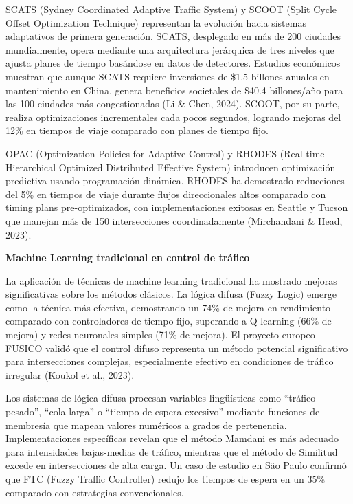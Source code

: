 \documentclass[12pt,a4paper,oneside]{report}
\begin{document}
SCATS (Sydney Coordinated Adaptive Traffic System) y SCOOT (Split Cycle Offset Optimization Technique) representan la evolución hacia sistemas adaptativos de primera generación. SCATS, desplegado en más de 200 ciudades mundialmente, opera mediante una arquitectura jerárquica de tres niveles que ajusta planes de tiempo basándose en datos de detectores. Estudios económicos muestran que aunque SCATS requiere inversiones de \$1.5 billones anuales en mantenimiento en China, genera beneficios societales de \$40.4 billones/año para las 100 ciudades más congestionadas (Li \& Chen, 2024). SCOOT, por su parte, realiza optimizaciones incrementales cada pocos segundos, logrando mejoras del 12\% en tiempos de viaje comparado con planes de tiempo fijo.

OPAC (Optimization Policies for Adaptive Control) y RHODES (Real-time Hierarchical Optimized Distributed Effective System) introducen optimización predictiva usando programación dinámica. RHODES ha demostrado reducciones del 5\% en tiempos de viaje durante flujos direccionales altos comparado con timing plans pre-optimizados, con implementaciones exitosas en Seattle y Tucson que manejan más de 150 intersecciones coordinadamente (Mirchandani \& Head, 2023).

\textbf{Machine Learning tradicional en control de tráfico}

La aplicación de técnicas de machine learning tradicional ha mostrado mejoras significativas sobre los métodos clásicos. La lógica difusa (Fuzzy Logic) emerge como la técnica más efectiva, demostrando un 74\% de mejora en rendimiento comparado con controladores de tiempo fijo, superando a Q-learning (66\% de mejora) y redes neuronales simples (71\% de mejora). El proyecto europeo FUSICO validó que el control difuso representa un método potencial significativo para intersecciones complejas, especialmente efectivo en condiciones de tráfico irregular (Koukol et al., 2023).

Los sistemas de lógica difusa procesan variables lingüísticas como ``tráfico pesado'', ``cola larga'' o ``tiempo de espera excesivo'' mediante funciones de membresía que mapean valores numéricos a grados de pertenencia. Implementaciones específicas revelan que el método Mamdani es más adecuado para intensidades bajas-medias de tráfico, mientras que el método de Similitud excede en intersecciones de alta carga. Un caso de estudio en São Paulo confirmó que FTC (Fuzzy Traffic Controller) redujo los tiempos de espera en un 35\% comparado con estrategias convencionales.
\end{document}
